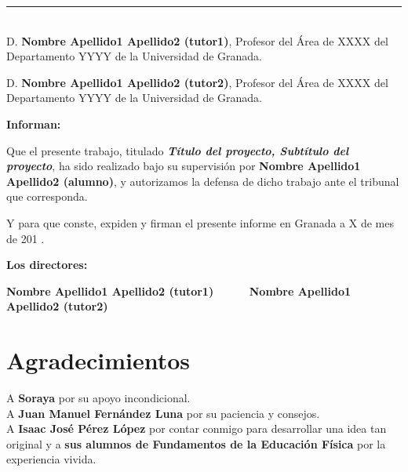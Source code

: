 \noindent\rule[-1ex]{\textwidth}{2pt}\\[4.5ex]

D. \textbf{Nombre Apellido1 Apellido2 (tutor1)}, Profesor del Área de XXXX del Departamento YYYY de la Universidad de Granada.

\vspace{0.5cm}

D. \textbf{Nombre Apellido1 Apellido2 (tutor2)}, Profesor del Área de XXXX del Departamento YYYY de la Universidad de Granada.


\vspace{0.5cm}

\textbf{Informan:}

\vspace{0.5cm}

Que el presente trabajo, titulado \textit{\textbf{Título del proyecto, Subtítulo del proyecto}},
ha sido realizado bajo su supervisión por \textbf{Nombre Apellido1 Apellido2 (alumno)}, y autorizamos la defensa de dicho trabajo ante el tribunal
que corresponda.

\vspace{0.5cm}

Y para que conste, expiden y firman el presente informe en Granada a X de mes de 201 .

\vspace{1cm}

\textbf{Los directores:}

\vspace{5cm}

\noindent \textbf{Nombre Apellido1 Apellido2 (tutor1) \ \ \ \ \ Nombre Apellido1 Apellido2 (tutor2)}

\chapter*{Agradecimientos}
\thispagestyle{empty}

       \vspace{1cm}


A \textbf{Soraya} por su apoyo incondicional.\\

A \textbf{Juan Manuel Fernández Luna} por su paciencia y consejos.\\

A \textbf{Isaac José Pérez López} por contar conmigo para desarrollar una idea tan original y a \textbf{sus alumnos de Fundamentos de la Educación Física} por la experiencia vivida.

